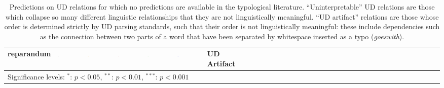 \documentclass[10pt,twoside,lineno]{article}
\begin{document}
\begin{table}
\begin{center}
{\begin{tabular}{|l|l|l|ll|l|l|llllllllllllllllllllllllllll}
reparandum  &  \includegraphics[width=0.06\textwidth]{../results/correlations/figures/posteriors/posterior_perRelation_Real_reparandum.pdf}   &   \includegraphics[width=0.06\textwidth]{../results/correlations/figures/posteriors/posterior_perRelation_DependencyLength_reparandum.pdf}   &   \includegraphics[width=0.06\textwidth]{../results/correlations/figures/posteriors/posterior_perRelation_Predictability_reparandum.pdf}  &   \includegraphics[width=0.06\textwidth]{../results/correlations/figures/posteriors/posterior_perRelation_Parseability_reparandum.pdf}  &  \includegraphics[width=0.06\textwidth]{../results/correlations/figures/posteriors/posterior_perRelation_Efficiency_reparandum.pdf}   &                UD Artifact \\          

 \hline
    \multicolumn{7}{l}{\footnotesize{Significance levels: $^*$: $p < 0.05$, $^{**}$: $p < 0.01$, $^{***}$: $p < 0.001$}}
\end{tabular}
}

\end{center}
\caption{Predictions on UD relations for which no predictions are available in the typological literature.  ``Uninterpretable'' UD relations are those which collapse so many different linguistic relationships that they are not linguistically meaningful. ``UD artifact'' relations are those whose order is determined strictly by UD parsing standards, such that their order is not linguistically meaningful: these include dependencies such as the connection between two parts of a word that have been separated by whitespace inserted as a typo (\emph{goeswith}).}
\label{tab:all-predictions-2}
\end{table}
\end{document}
